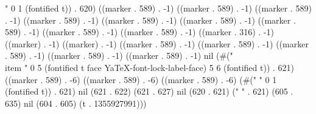 " 0 1 (fontified t)) . 620) ((marker . 589) . -1) ((marker . 589) . -1) ((marker . 589) . -1) ((marker . 589) . -1) ((marker . 589) . -1) ((marker . 589) . -1) ((marker . 589) . -1) ((marker . 589) . -1) ((marker . 589) . -1) ((marker . 316) . -1) ((marker) . -1) ((marker) . -1) ((marker . 589) . -1) ((marker . 589) . -1) ((marker . 589) . -1) ((marker . 589) . -1) ((marker . 589) . -1) nil (#("\\item " 0 5 (fontified t face YaTeX-font-lock-label-face) 5 6 (fontified t)) . 621) ((marker . 589) . -6) ((marker . 589) . -6) ((marker . 589) . -6) (#(" " 0 1 (fontified t)) . 621) nil (621 . 622) (621 . 627) nil (620 . 621) (" " . 621) (605 . 635) nil (604 . 605) (t . 1355927991)))

